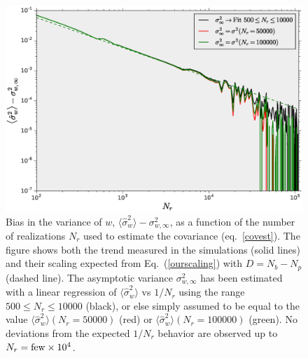 \documentclass[reprint,aps,prd,superscriptaddress,showkeys,showpacs]{revtex4-1}
\newcommand{\h}[1]{\hat{#1}}
\begin{document}
\begin{figure}
\includegraphics[scale=0.3]{Figures/scaling_nr.eps}
\caption{Bias in the variance of $w$,
  $\langle\h{\sigma}^2_w\rangle-\sigma^2_{w,\infty}$, as a function of
  the number of realizations $N_r$ used to estimate the covariance
  (eq.~\ref{covest}). The figure shows both the trend measured in the
  simulations (solid lines) and their scaling expected from
  Eq.~(\ref{ourscaling}) with $D=N_b-N_p$ (dashed line). The
  asymptotic variance $\sigma^2_{w,\infty}$ has been estimated with a
  linear regression of $\langle\h{\sigma}^2_w\rangle$ vs $1/N_r$ using
  the range $500\leq N_r\leq 10000$ (black), or else simply assumed to
  be equal to the value $\langle\h{\sigma}^2_w\rangle(N_r=50000)$
  (red) or $\langle\h{\sigma}^2_w\rangle(N_r=100000)$ (green). No
  deviations from the expected $1/N_r$ behavior are observed up to
  $N_r={\rm few}\times 10^4$.}
\label{wvar_nr}
\end{figure}
\end{document}
